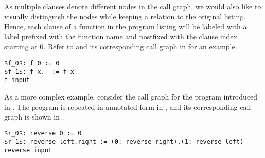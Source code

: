As multiple clauses denote different nodes in the call graph, we would also
like to visually distinguish the nodes while keeping a relation to the original
listing. Hence, each clause of a function in the program listing will be
labeled with a label prefixed with the function name and postfixed with the
clause index starting at $0$. Refer to  and its
corresponding call graph in  for an example.

\begin{lstlisting}[label=listing:cfg-loop,
  caption={A simple, down-counting loop in \D{}.}]
$f_0$: f 0 := 0
$f_1$: f x._ := f x
f input
\end{lstlisting}


As a more complex example, consider the call graph for the program
 introduced in . The program is
repeated in annotated form in , and its
corresponding call graph is shown in .

\begin{lstlisting}[label=listing:cfg-reverse,
  caption={An annotated version of the program \mono{reverse} introduced in
  \referToSection{d-samples}.}]
$r_0$: reverse 0 := 0
$r_1$: reverse left.right := (0: reverse right).(1: reverse left)
reverse input
\end{lstlisting}

